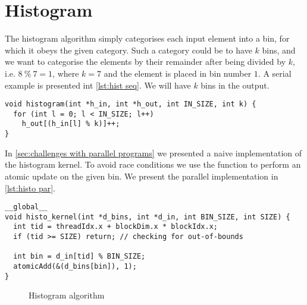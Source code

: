 \section{Histogram}
\label{sec:histogram}

The histogram algorithm simply categorises each input element into a bin, for which it obeys the given category.
Such a category could be to have $k$ bins, and we want to categorise the elements by their remainder after being divided by $k$, i.e. $8\ \%\ 7 = 1$, where $k = 7$ and the element is placed in bin number $1$.
A serial example is presented int \cref{lst:hist seq}.
We will have $k$ bins in the output.

\begin{lstlisting}[caption={Serial histogram}, label={lst:hist seq}]
void histogram(int *h_in, int *h_out, int IN_SIZE, int k) {
  for (int l = 0; l < IN_SIZE; l++) 
    h_out[(h_in[l] % k)]++;
}
\end{lstlisting}

In \cref{sec:challenges with parallel programs} we presented a naive implementation of the histogram kernel.
To avoid race conditions we use the  function to perform an atomic update on the given bin.
We present the parallel implementation in \cref{lst:histo par}.

\begin{lstlisting}[caption={Simple parallel histogram implementation}, label={lst:histo par}]
__global__ 
void histo_kernel(int *d_bins, int *d_in, int BIN_SIZE, int SIZE) {
  int tid = threadIdx.x + blockDim.x * blockIdx.x;
  if (tid >= SIZE) return; // checking for out-of-bounds

  int bin = d_in[tid] % BIN_SIZE;
  atomicAdd(&(d_bins[bin]), 1);
}
\end{lstlisting}


\begin{figure}[htb]
  \centering
    
  \caption{Histogram algorithm}
  \label{fig:histogram plot}
\end{figure}
